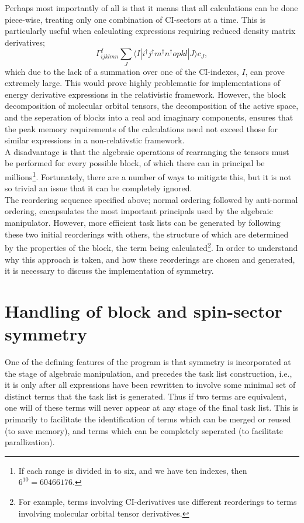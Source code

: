 \documentclass[12pt]{article}
\begin{document}
\noindent Perhaps most importantly of all is that it means that
all calculations can be done piece-wise, treating only one combination of CI-sectors
at a time. This is particularly useful when calculating expressions requiring reduced density matrix derivatives;
\begin{equation}
\Gamma^{I}_{ijklmn}\sum_{J}\langle I | i^{\dagger}j^{\dagger}m^{\dagger}n^{\dagger}opkl | J \rangle c_{J},
\end{equation}
which due to the lack of a summation over one of the CI-indexes, $I$, can prove extremely large. This
would prove highly problematic for implementations of energy derivative expressions in the
relativistic framework. However, the block decomposition of molecular orbital tensors,
the decomposition of the active space, and the seperation of blocks into
a real and imaginary components, ensures that the peak memory requirements of the 
calculations need not exceed those for similar expressions in a non-relativstic framework.\\

\noindent A disadvantage is that the algebraic operations of
rearranging the tensors must be performed for every possible block, of which
there can in principal be millions\footnote{ If each range is divided in to 
six, and we have ten indexes, then $6^{10} =60466176 $. }. Fortunately, there
are a number of ways to mitigate this, but it is not so trivial an issue that it can
be completely ignored.\\

\noindent The reordering sequence specified above; normal ordering followed by anti-normal 
ordering, encapsulates the most important principals used by the algebraic manipulator. However,
more efficient task lists can be generated by following these two initial reorderings with others, the
structure of which are determined by the properties of the block, the term being calculated\footnote{
For example, terms involving CI-derivatives use different reorderings to terms involving molecular orbital
tensor derivatives.}. In order to understand why this approach is taken, and how these reorderings
are chosen and generated, it is necessary to discuss the implementation of symmetry.

\section{Handling of block and spin-sector symmetry}

\noindent One of the defining features of the program is that
symmetry is incorporated at the stage of algebraic manipulation, 
and precedes the task list construction, i.e., it is only after 
all expressions have been rewritten to involve some minimal set of 
distinct terms that the task list is generated. Thus if two terms are 
equivalent, one will of these terms will never appear at any stage of the final task list.
This is primarily to facilitate the identification of terms which can be merged or reused (to save memory),
and terms which can be completely seperated (to facilitate parallization).\\
\end{document}
